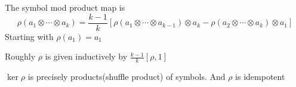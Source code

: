 \documentclass[main]{subfiles}
\begin{document}
\begin{definition}
The symbol mod product map is
\[\rho(a_1\otimes\cdots\otimes a_k)=\frac{k-1}{k}[\rho(a_1\otimes\cdots\otimes a_{k-1})\otimes a_k-\rho(a_2\otimes\cdots\otimes a_k)\otimes a_1]\]
Starting with $\rho(a_1)=a_1$
\end{definition}

\begin{note}
Roughly $\rho$ is given inductively by $\frac{k-1}{k}[\rho,1]$
\end{note}

\begin{theorem}
$\ker\rho$ is precisely products(shuffle product) of symbols. And $\rho$ is idempotent
\end{theorem}
\end{document}
